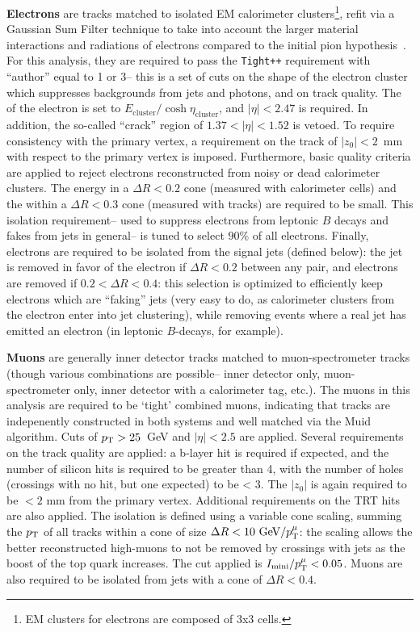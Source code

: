 	\textbf{Electrons} are tracks matched to isolated EM calorimeter clusters\footnote{EM clusters for electrons are composed of 3x3 cells.}, refit via a Gaussian Sum Filter technique to take into account the larger material interactions and radiations of electrons compared to the initial pion hypothesis~. For this analysis, they are required to pass the \texttt{Tight++} requirement with ``author'' equal to 1 or 3-- this is a set of cuts on the shape of the electron cluster which suppresses backgrounds from jets and photons, and on track quality. The \pt of the electron is set to $E_\mathrm{cluster} / \cosh \eta_\mathrm{cluster}$, and $|\eta| < 2.47$ is required. In addition, the so-called ``crack'' region of $1.37 < |\eta| < 1.52$ is vetoed. To require consistency with the primary vertex, a requirement on the track of $|z_0| < 2$~mm with respect to the primary vertex is imposed. Furthermore, basic quality criteria are applied to reject electrons reconstructed from noisy or dead calorimeter clusters. The energy in a $\Delta R < 0.2$ cone (measured with calorimeter cells) and the \pt within a $\Delta R < 0.3$ cone (measured with tracks) are required to be small. This isolation requirement-- used to suppress electrons from leptonic $B$ decays and fakes from jets in general-- is tuned to select $90\%$ of all electrons. Finally, electrons are required to be isolated from the signal jets (defined below): the jet is removed in favor of the electron if $\Delta R < 0.2$ between any pair, and electrons are removed if $0.2 < \Delta R < 0.4$: this selection is optimized to efficiently keep electrons which are ``faking'' jets (very easy to do, as calorimeter clusters from the electron enter into jet clustering), while removing events where a real jet has emitted an electron (in leptonic $B$-decays, for example).

	\textbf{Muons} are generally inner detector tracks matched to muon-spectrometer tracks (though various combinations are possible-- inner detector only, muon-spectrometer only, inner detector with a calorimeter tag, etc.). The muons in this analysis are required to be `tight' combined muons, indicating that tracks are indepenently constructed in both systems and well matched via the Muid algorithm. Cuts of $p_{\text{T}} > 25$~GeV and $|\eta|<2.5$ are applied. Several requirements on the track quality are applied: a b-layer hit is required if expected, and the number of silicon hits is required to be greater than 4, with the number of holes (crossings with no hit, but one expected) to be < 3. The $|z_0|$ is again required to be $< 2$ mm from the primary vertex. Additional requirements on the TRT hits are also applied. The isolation is defined using a variable cone scaling, summing the $p_{\text{T}}$ of all tracks within a cone of size $\Delta R < 10~\mathrm{GeV} / p_{\text{T}}^{\mu}$: the scaling allows the better reconstructed high-\pt muons to not be removed by crossings with jets as the boost of the top quark increases. The cut applied is $I_\mathrm{mini} / p_{\text{T}}^{\mu} < 0.05 $.  Muons are also required to be isolated from jets with a cone of $\Delta R < 0.4$.

